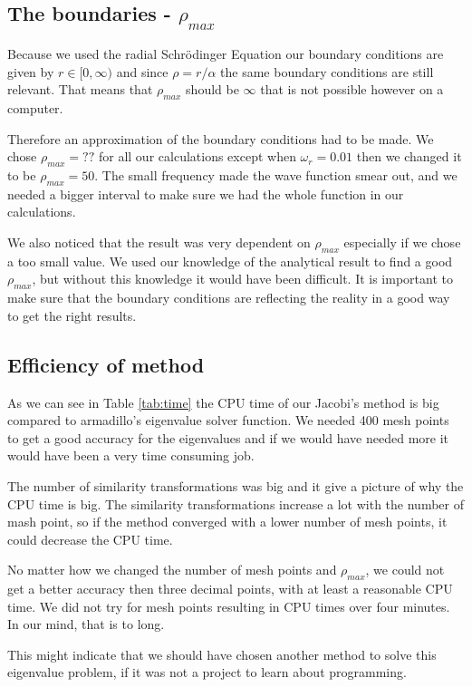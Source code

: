 \subsection{The boundaries - $\rho_{max}$}

Because we used the radial Schrödinger Equation our boundary conditions are given by $r\in[0,\infty)$ and since $\rho = r/\alpha$ the same boundary conditions are still relevant. That means that $\rho_{max}$ should be $\infty$ that is not possible however on a computer.

Therefore an approximation of the boundary conditions had to be made. We chose $\rho_{max} = ?? $ for all our calculations except when $\omega_r = 0.01$ then we changed it to be $\rho_{max} = 50$. The small frequency made the wave function smear out, and we needed a bigger interval to make sure we had the whole function in our calculations. 

We also noticed that the result was very dependent on $\rho_{max}$ especially if we chose a too small value. We used our knowledge of the analytical result to find a good $\rho_{max}$, but without this knowledge it would have been difficult. It is important to make sure that the boundary conditions are reflecting the reality in a good way to get the right results. 

\subsection{Efficiency of method}

As we can see in Table \ref{tab:time} the CPU time of our Jacobi's method is big compared to armadillo's eigenvalue solver function. We needed 400 mesh points to get a good accuracy for the eigenvalues and if we would have needed more it would have been a very time consuming job.

The number of similarity transformations was big and it give a picture of why the CPU time is big. The similarity transformations increase a lot with the number of mash point, so if the method converged with a lower number of mesh points, it could decrease the CPU time.  

No matter how we changed the number of mesh points and $\rho_{max}$, we could not get a better accuracy then three decimal points, with at least a reasonable CPU time. We did not try for mesh points resulting in CPU times over four minutes. In our mind, that is to long.  

This might indicate that we should have chosen another method to solve this eigenvalue problem, if it was not a project to learn about programming.

